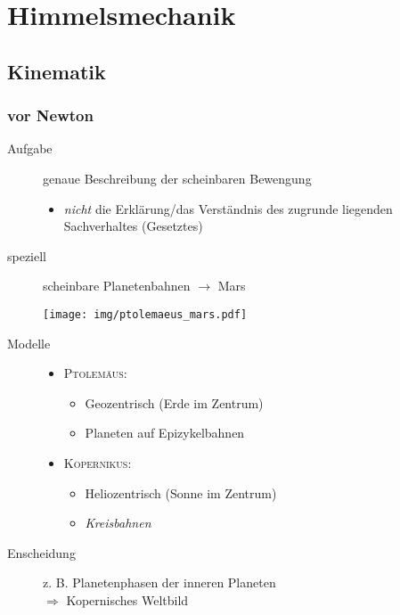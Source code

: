 
\chapter{Himmelsmechanik}
\section{Kinematik}
\subsection*{vor Newton}
\begin{description}
    \item[Aufgabe] genaue Beschreibung der scheinbaren Bewengung
        \begin{itemize}
            \item \emph{nicht} die Erklärung/das Verständnis des zugrunde
                  liegenden Sachverhaltes (Gesetztes)
        \end{itemize}
    \item[speziell] scheinbare Planetenbahnen $\rightarrow$ Mars
        \begin{center}
            \texttt{[image: img/ptolemaeus\_mars.pdf]}
        \end{center}
    \item[Modelle]
        \begin{itemize}
            \item \textsc{Ptolemäus:}
                \begin{itemize}
                    \item Geozentrisch (Erde im Zentrum)
                    \item Planeten auf Epizykelbahnen
                \end{itemize}
            \item \textsc{Kopernikus:}
                \begin{itemize}
                    \item Heliozentrisch (Sonne im Zentrum)
                    \item \emph{Kreisbahnen}
                \end{itemize}
        \end{itemize}
    \item[Enscheidung] z. B. Planetenphasen der inneren Planeten\\
        $\Rightarrow$ Kopernisches Weltbild
\end{description}
